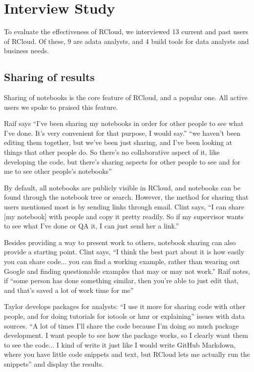 \section{Interview Study\label{sec:interviews}}

To evaluate the effectiveness of RCloud, we interviewed 13 current and past
users of RCloud. Of these, 9 are adata analysts, and 4 build tools for data
analysts and business needs.



\subsection{Sharing of results}
Sharing of notebooks is the core feature of RCloud, and a popular one. All
active users we spoke to praised this feature.


Raif says ``I've been sharing my notebooks in order for other people to see what
I've done. It's very convenient for that purpose, I would say.'' ``we haven't
been editing them together, but we've been just sharing, and I've been looking
at things that other people do. So there's no collaborative aspect of it, like
developing the code, but there's sharing aspects for other people to see and for
me to see other people's notebooks''

By default, all notebooks are publicly visible in RCloud, and notebooks can be
found through the notebook tree or search. However, the method for sharing that
users mentioned most is by sending links through email. Clint says, ``I can
share [my notebook] with people and copy it pretty readily. So if my supervisor
wants to see what I've done or QA it, I can just send her a link.''

Besides providing a way to present work to others, notebook sharing can also
provide a starting point. Clint says, ``I think the best part about it is how
easily you can share code... you can find a working example, rather than wearing
out Google and finding questionable examples that may or may not work.'' Raif
notes, if ``some person has done something similar, then you're able to just
edit that, and that's saved a lot of work time for me''

Taylor develops packages for analysts: ``I use it more for sharing code with
other people, and for doing tutorials for iotools or hmr or explaining'' issues with data sources. ``A lot
of times I'll share the code because I'm doing so much package development. I
want people to see how the package works, so I clearly want them to see the
code... I kind of write it just like I would write GitHub Markdown, where you have
little code snippets and text, but RCloud lets me actually run the snippets''
and display the results.


